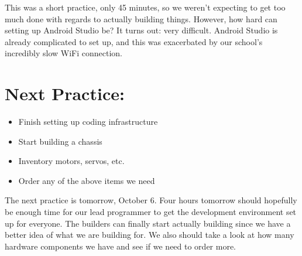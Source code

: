 \documentclass[12pt]{article}
\begin{document}
This was a short practice, only 45 minutes, so we weren't expecting to get too much done with regards to actually building things. However, how hard can setting up Android Studio be? It turns out: very difficult. Android Studio is already complicated to set up, and this was exacerbated by our school's incredibly slow WiFi connection. 

\section{Next Practice:}
\begin{itemize}
	\item Finish setting up coding infrastructure
	\item Start building a chassis
	\item Inventory motors, servos, etc.
	\item Order any of the above items we need
\end{itemize}

The next practice is tomorrow, October 6. %
Four hours tomorrow should hopefully be enough time for our lead programmer to get the development environment set up for everyone. The builders can finally start actually building since we have a better idea of what we are building for. We also should take a look at how many hardware components we have and see if we need to order more.
\end{document}
